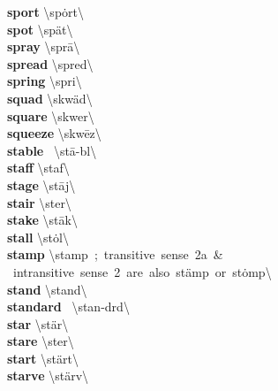 \documentclass[10pt,a4paper]{article}
\begin{document}
\begin{multicols}{2}
\textbf{ sport }\quad \textbackslash \textprimstress sp\.{o}rt\textbackslash \\
\textbf{ spot }\quad \textbackslash \textprimstress sp\"{a}t\textbackslash \\
\textbf{ spray }\quad \textbackslash \textprimstress spr\={a}\textbackslash \\
\textbf{ spread }\quad \textbackslash \textprimstress spred\textbackslash \\
\textbf{ spring }\quad \textbackslash \textprimstress spri\engma \textbackslash \\
\textbf{ squad }\quad \textbackslash \textprimstress skw\"{a}d\textbackslash \\
\textbf{ square }\quad \textbackslash \textprimstress skwer\textbackslash \\
\textbf{ squeeze }\quad \textbackslash \textprimstress skw\={e}z\textbackslash \\
\textbf{ stable }\quad \ \textbackslash \textprimstress st\={a}-b\textschwa l\textbackslash \\
\textbf{ staff }\quad \textbackslash \textprimstress staf\textbackslash \\
\textbf{ stage }\quad \textbackslash \textprimstress st\={a}j\textbackslash \\
\textbf{ stair }\quad \textbackslash \textprimstress ster\textbackslash \\
\textbf{ stake }\quad \textbackslash \textprimstress st\={a}k\textbackslash \\
\textbf{ stall }\quad \textbackslash \textprimstress st\.{o}l\textbackslash \\
\textbf{ stamp }\quad \textbackslash \textprimstress stamp\ ;\ transitive\ sense\ 2a\ \& \ intransitive\ sense\ 2\ are\ also\ \textprimstress st\"{a}mp\ or\ \textprimstress st\.{o}mp\textbackslash \\
\textbf{ stand }\quad \textbackslash \textprimstress stand\textbackslash \\
\textbf{ standard }\quad \ \textbackslash \textprimstress stan-d\textschwa rd\textbackslash \\
\textbf{ star }\quad \textbackslash \textprimstress st\"{a}r\textbackslash \\
\textbf{ stare }\quad \textbackslash \textprimstress ster\textbackslash \\
\textbf{ start }\quad \textbackslash \textprimstress st\"{a}rt\textbackslash \\
\textbf{ starve }\quad \textbackslash \textprimstress st\"{a}rv\textbackslash \\

\end{multicols}
\end{document}
